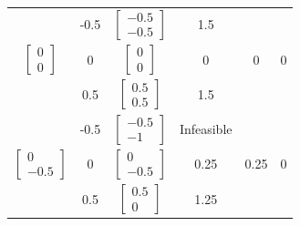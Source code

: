 \begin{latin}
\begin{longtable}{|c|c|c|c|c|c|}
		&          -0.5              &$\begin{bmatrix} -0.5 \\ -0.5 \end{bmatrix}$      &        1.5             &      &        \\  \cline{2-4} 
		\multirow{-3}{*}{$\begin{bmatrix} 0 \\ 0 \end{bmatrix}$}&       0                 &$\begin{bmatrix} 0 \\ 0 \end{bmatrix}$      &     0                   &        0        &0  \\  \cline{2-4} 
		&           0.5             &$\begin{bmatrix} 0.5 \\ 0.5 \end{bmatrix}$      &             1.5            &           &  \\  \cline{2-4} \hline
		
		& -0.5 &$\begin{bmatrix} -0.5 \\ -1 \end{bmatrix}$      & Infeasible                        &             &      \\ \cline{2-4}
		\multirow{-3}{*}{$\begin{bmatrix} 0 \\ -0.5 \end{bmatrix}$}& 0    &$\begin{bmatrix} 0 \\ -0.5 \end{bmatrix}$      &     0.25                   &    0.25        &  0     \\ \cline{2-4}
		& 0.5  &$\begin{bmatrix} 0.5 \\ 0 \end{bmatrix}$      &    1.25                     &          &       \\ \hline
		

\end{longtable}
\end{latin}

